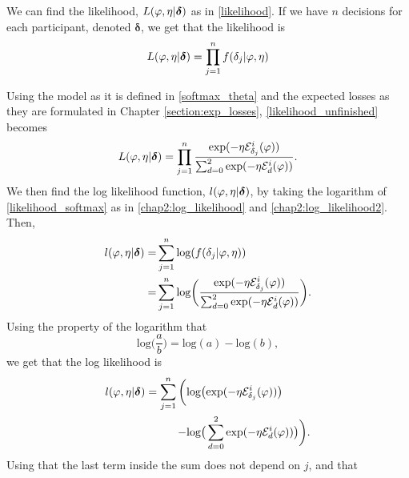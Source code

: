 We can find the likelihood, $L(\varphi,\eta|\boldsymbol{\delta})$ as in \eqref{likelihood}. If we have $n$ decisions for each participant, denoted $\boldsymbol{\delta}$, we get that the likelihood is 
\begin{equation}
\label{likelihood_unfinished}
    \begin{aligned}
       L(\varphi,\eta|\boldsymbol{\delta}) = \prod_{j=1}^n f(\delta_j|\varphi,\eta)
    \end{aligned}
\end{equation}

Using the model as it is defined in  \eqref{softmax_theta} and the expected losses as they are formulated in Chapter \ref{section:exp_losses}, \eqref{likelihood_unfinished} becomes
\begin{equation}
\label{likelihood_softmax}
    L(\varphi,\eta|\boldsymbol{\delta}) = \prod_{j=1}^n \frac{\text{exp}(- \eta \mathcal{E}^i_{\delta_{j}}(\varphi))}{\sum_{d=0}^{2} \text{exp}(-\eta \mathcal{E}^i_{d}(\varphi))}.
\end{equation}
We then find the log likelihood function, $l(\varphi,\eta|\boldsymbol{\delta})$, by taking the logarithm of \eqref{likelihood_softmax} as in \eqref{chap2:log_likelihood} and \eqref{chap2:log_likelihood2}. Then,
\begin{equation}
\label{log_likel_softmax_1}
    \begin{aligned}
       l(\varphi,\eta|\boldsymbol{\delta})
       =& \sum_{j=1}^n \text{log} (f(\delta_j|\varphi,\eta)) \\
       =& \sum_{j=1}^n \text{log} \bigg( \frac{\text{exp}(- \eta \mathcal{E}^i_{\delta_{j}}(\varphi))}{\sum_{d=0}^{2} \text{exp}(-\eta \mathcal{E}^i_{d}(\varphi))} \bigg).
    \end{aligned}
\end{equation}
Using the property of the logarithm that 
\begin{equation*}
    \text{log}\Big(\frac{a}{b} \Big) = \text{log}(a) - \text{log}(b),
\end{equation*}
we get that the log likelihood is
\begin{equation}
\label{log_likel_softmax_2}
    \begin{aligned}
       l(\varphi,\eta|\boldsymbol{\delta})
       = \sum_{j=1}^n \bigg( &\text{log} \big( \text{exp}(- \eta \mathcal{E}^i_{\delta_{j}}(\varphi))\big)\\
       - &\text{log} \big( \sum_{d=0}^{2} \text{exp}(-\eta \mathcal{E}^i_{d}(\varphi)) \big)
       \bigg).
    \end{aligned}
\end{equation}
Using that the last term inside the sum does not depend on $j$, and that 
